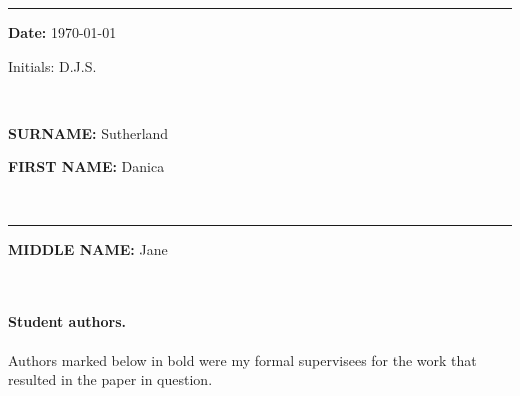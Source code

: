 \documentclass[10pt]{article}
\begin{document}
%



\newpage
{}\bigskip\rule{3.5in}{0mm}
\parbox[t]{2in}{{\bf Date:} \today}\parbox[t]{1in}{Initials: D.J.S.} \\
\noindent\parbox[t]{.5in}{\mbox{}}\parbox[t]{3.04in}{{\bf SURNAME:}
  Sutherland}\parbox[t]{3.2in}{{\bf FIRST NAME:} Danica}
\\\rule{3.54in}{0mm}\parbox[t]{3.2in}{{\bf MIDDLE NAME:} Jane}
\\[5mm]
\setcounter{section}{0}
\vspace{12pt}



\paragraph{Student authors.} Authors marked below in bold were my formal supervisees for the work that resulted in the paper in question.
\end{document}
